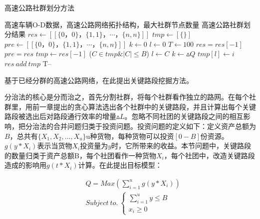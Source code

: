 				\begin{algorithm}[h]
		        \caption{高速公路社群划分方法}  
		        \label{shequn}
		        \begin{algorithmic}[1] %
		            \Require 高速车辆O-D数据，高速公路网络拓扑结构，最大社群节点数量
		            \Ensure 高速公路社群划分结果
		                \State $res\gets [[\{0，0\}，\{1,1\}，\cdots，\{n,n\}]]$ 
		                \State $tmp\gets [\{\}]$
		                \State $pre\gets [[\{0，0\}，\{1,1\}，\cdots，\{n,n\}]]$ 
		                \State $k\gets 0$  
		                \State $l\gets 0$
		                \State $T\gets 100$  
		                	\State $res=res[-1]$
		                	\State $pre=res$
			                	\State $tmp\gets res[-1]$  
			                		\For($C \in tmp \& |C| \le B$)
				                        	\State $l\gets C$  
				                        	\State $k\gets {\vartriangle Q}$  
			                    		\EndIf	
			                		\EndFor
			                    	\State $tmp[l] \gets i$ 
			                	\EndFor
			                	\State $res \ add \ tmp$
		                	\EndWhile
		                	\State T--
		                \EndWhile  
		                \State {}  
		            \EndFunction  
		        \end{algorithmic}  
		    	\end{algorithm} 


				基于已经分群的高速公路网络，在此提出关键路段挖掘方法。

				分治法的核心是分而治之，首先分割社群，将每个社群看作独立的路网。在每个社群里，用前一章提出的贪心算法选出各个社群中的关键路段，并且计算出每个关键路段被选出后对路段通行效率的增量$\vartriangle L$。忽略不同社团的关键路段之间的相互影响，把分治法的合并问题归类于投资问题。投资问题的定义如下：定义资产总额为$B$，总共有$\{X_1,X_2,\dots,X_u\}$u种货物，每种货物可以投资$[0-B]$份资源。$g(y*X_{i})$表示当货物$X_i$投资量为$y$时，它所带来的收益。本节问题中，关键路段的数量归类于资产总额B，每个社团看作一种货物$X_i$，每个社团中，改造关键路段造成的影响用$g(t*X_{i})$计算。在此提出目标模型：

				\begin{align}
				 &Q=Max(\sum\limits_{i = 1}^u {g({y}*{X_i})})   \label{fenzhi-merge} \\
				 &Subject \  to. \  \left\{ {\begin{array}{*{20}{c}}
					  {\sum\limits_{i = 1}^u {{y}}  \leqslant B} \\ 
					  {{x_i} \geqslant 0} 
				\end{array}} \right.
				\end{align}

